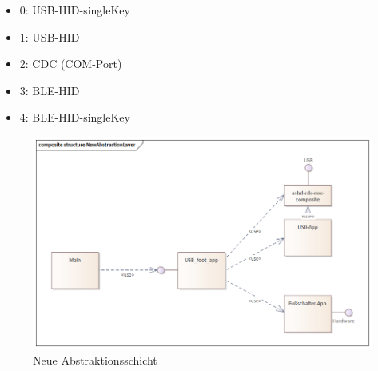 \begin{itemize}
	\item 0: USB-\ac{HID}-singleKey
	\item 1: USB-\ac{HID}
	\item 2: CDC (COM-Port)
	\item 3: \ac{BLE}-\ac{HID}
	\item 4: \ac{BLE}-\ac{HID}-singleKey
\end{itemize}

\begin{figure}[H] 
	\centering
	\includegraphics[width=\textwidth]{figures/NewAbstractionLayer.png}
	\caption{Neue Abstraktionsschicht}
\end{figure}

